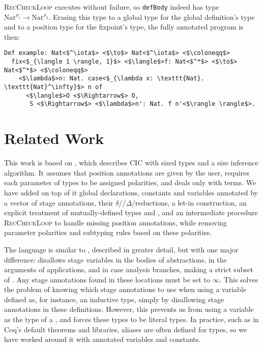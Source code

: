 \documentclass[acmsmall,screen,review,10pt]{acmart} %
\begin{document}
\textsc{RecCheckLoop} executes without failure, so \texttt{defBody} indeed has type $\text{Nat}^{\rho_1} \to \text{Nat}^{\rho_2}$. Erasing this type to a global type for the global definition's type and to a position type for the fixpoint's type, the fully annotated program is then:

\begin{verbatim}
Def example: Nat<$^\iota$> <$\to$> Nat<$^\iota$> <$\coloneqq$>
  fix<$_{\langle 1 \rangle, 1}$> <$\langle$>f: Nat<$^*$> <$\to$> Nat<$^*$> <$\coloneqq$>
    <$\lambda$>n: Nat. case<$_{\lambda x: \texttt{Nat}. \texttt{Nat}^\infty}$> n of
      <$\langle$>O <$\Rightarrow$> O,
       S <$\Rightarrow$> <$\lambda$>n': Nat. f n'<$\rangle \rangle$>.
\end{verbatim}

\section{Related Work}\label{sec:related}

This work is based on \CIChat \cite{cic-hat}, which describes CIC with sized types and a size inference algorithm. It assumes that position annotations are given by the user, requires each parameter of \coinductive types to be assigned polarities, and deals only with terms. We have added on top of it global declarations, constants and variables annotated by a vector of stage annotations, their $\delta$\-//$\Delta$\-/reductions, a let-in construction, an explicit treatment of mutually-defined \coinductive types and \cofixpoints, and an intermediate procedure \textsc{RecCheckLoop} to handle missing position annotations, while removing parameter polarities and subtyping rules based on these polarities.

The language \CIChatbar \cite{cic-hat-bar} is similar to \CIChat, described in greater detail, but with one major difference: \CIChatbar disallows stage variables in the bodies of abstractions, in the arguments of applications, and in case analysis branches, making \CIChatbar a strict subset of \CIChat. Any stage annotations found in these locations must be set to $\infty$. This solves the problem of knowing which stage annotations to use when using a variable defined as, for instance, an inductive type, simply by disallowing stage annotations in these definitions. However, this prevents us from using a variable as the \corecursive type of a \cofixpoint, and forces these types to be literal \coinductive types. In practice, such as in Coq's default theorems and libraries, aliases are often defined for \coinductive types, so we have worked around it with annotated variables and constants.
\end{document}
